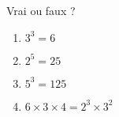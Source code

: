 
Vrai ou faux ?

\begin{enumerate}
\item $3^3 = 6$
\item $2^5 = 25$
\item $5^3 = 125$
\item $6 \times 3 \times 4 = 2^3 \times 3^2$
\end{enumerate}